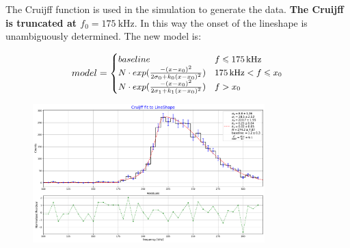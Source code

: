 \documentclass[9pt]{beamer}
\begin{document}
\begin{frame}

The Cruijff function is used in the simulation to generate the data. \textbf{The Cruijff is truncated at $f_{0} = \SI{175}{\kilo \hertz}$}. In this way the onset of the lineshape is unambiguously determined. The new model is:

\begin{equation}
{\small
model =
\begin{cases}
baseline 	& f \leqslant \SI{175}{\kilo \hertz} \\
N \cdot exp(  \frac{-(x - x_{0})^2}{2\sigma_{0} + k_{0}(x - x_{0})^{2}}) & \SI{175}{\kilo \hertz} < f \leqslant x_{0} \\
N \cdot exp(  \frac{-(x - x_{0})^2}{2\sigma_{1} + k_{1}(x - x_{0})^{2}}) &  f >  x_{0}
\end{cases}
}
\end{equation}

\begin{figure}[hbtp]
\centering
\includegraphics[width = 0.8\textwidth]{../Plot/TruncatedLineShape.pdf}
\end{figure}
\end{frame}
\end{document}
